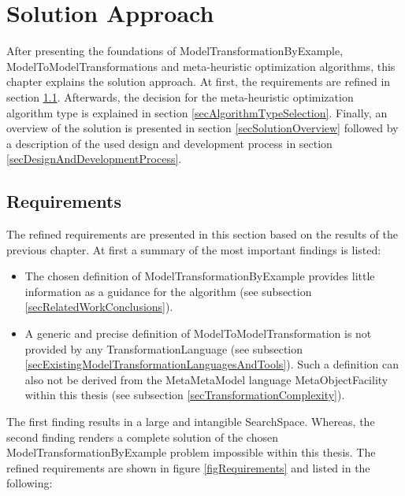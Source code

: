 \chapter{Solution Approach}\label{chapAlgorithmicApproach}

After presenting the foundations of \gls{ModelTransformationByExample}, \glspl{ModelToModelTransformation} and meta-heuristic optimization algorithms, this chapter explains the solution approach. At first, the requirements are refined in section \ref{secRequirements}. Afterwards, the decision for the meta-heuristic optimization algorithm type is explained in section \ref{secAlgorithmTypeSelection}. Finally, an overview of the solution is presented in section \ref{secSolutionOverview} followed by a description of the used design and development process in section \ref{secDesignAndDevelopmentProcess}.

\section{Requirements}
\label{secRequirements}

The refined requirements are presented in this section based on the results of the previous chapter. At first a summary of the most important findings is listed:

\begin{itemize}
	\item The chosen definition of \gls{ModelTransformationByExample} provides little information as a guidance for the algorithm (see subsection \ref{secRelatedWorkConclusions}).
	\item A generic and precise definition of \gls{ModelToModelTransformation} is not provided by any \gls{TransformationLanguage} (see subsection \ref{secExistingModelTransformationLanguagesAndTools}). Such a definition can also not be derived from the \gls{MetaMetaModel} language \gls{MetaObjectFacility} within this thesis (see subsection \ref{secTransformationComplexity}).
\end{itemize}

The first finding results in a large and intangible \gls{SearchSpace}. Whereas, the second finding renders a complete solution of the chosen \gls{ModelTransformationByExample} problem impossible within this thesis. The refined requirements are shown in figure \ref{figRequirements} and listed in the following:

